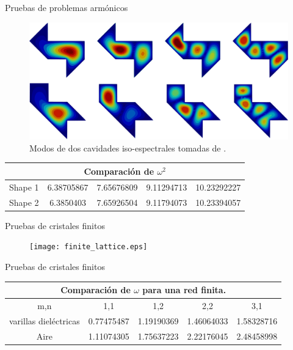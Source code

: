 \documentclass[xcolor=table,serif]{beamer}
\begin{document}
	\begin{frame}{Pruebas de problemas armónicos}
		\begin{figure}
		\centering
		\includegraphics[scale=0.11]{isoespectral.eps}
		\caption{Modos de dos cavidades iso-espectrales tomadas de \cite{Chapman1995}.}
		\label{fig:isoespectral_waveguide}
		\end{figure}
		\small
		\begin{center}
		\begin{tabular}{|c|c|c|c|c|}
		\hline
		\multicolumn{5}{|c|}{Comparación de $\omega^2$} \\
		\hline 
Shape 1  & 6.38705867 & 7.65676809 & 9.11294713 & 10.23292227 \\ 
		\hline 
Shape 2 & 6.3850403 & 7.65926504 & 9.11794073 & 10.23394057 \\ 
		\hline 
		\end{tabular}
		\end{center}
	\end{frame}
	\begin{frame}{Pruebas de cristales finitos}
		\begin{figure}
		\centering
		\texttt{[image: finite\_lattice.eps]}
		\end{figure}
	\end{frame}
	\begin{frame}{Pruebas de cristales finitos}
	\small
	\begin{center}
		\begin{tabular}{|c|c|c|c|c|}
		\hline
		\multicolumn{5}{|c|}{Comparación de $\omega$ para una red finita.} \\
\hline 
m,n & 1,1 & 1,2 & 2,2 & 3,1 \\ 
\hline 
varillas dieléctricas & 0.77475487 & 1.19190369 & 1.46064033 & 1.58328716 \\ 
\hline 
Aire  & 1.11074305 & 1.75637223 & 2.22176045 & 2.48458998 \\ 
\hline 
\end{tabular}

\end{center}
	\end{frame}
\end{document}
